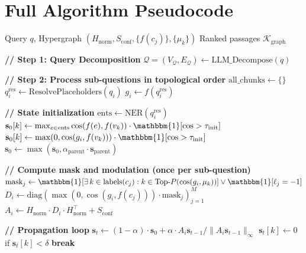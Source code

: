 \documentclass[11pt,a4paper]{article}
\begin{document}
\appendix

\section{Full Algorithm Pseudocode}

\begin{algorithm}[ht]
\caption{HyP-DLM: DAG-Guided Propagation Retrieval}
\label{alg:hypdlm}
\begin{algorithmic}[1]
\Require Query $q$, Hypergraph $(H_{\text{norm}}, S_{\text{conf}}, \{f(c_j)\}, \{\mu_k\})$
\Ensure Ranked passages $\mathcal{K}_{\text{graph}}$

\State \textbf{// Step 1: Query Decomposition}
\State $\mathcal{Q} = (V_\mathcal{Q}, E_\mathcal{Q}) \gets \text{LLM\_Decompose}(q)$ 

\State \textbf{// Step 2: Process sub-questions in topological order}
\State $\text{all\_chunks} \gets \{\}$
    \State $q_i^{\text{res}} \gets \text{ResolvePlaceholders}(q_i)$ 
    \State $g_i \gets f(q_i^{\text{res}})$ 
    
    \State \textbf{// State initialization}
    \State $\text{ents} \gets \text{NER}(q_i^{\text{res}})$
        \State $\mathbf{s}_0[k] \gets \max_{e \in \text{ents}} \cos(f(e), f(v_k)) \cdot \mathbbm{1}[\cos > \tau_{\text{init}}]$
    \Else
        \State $\mathbf{s}_0[k] \gets \max(0, \cos(g_i, f(v_k))) \cdot \mathbbm{1}[\cos > \tau_{\text{init}}]$ 
    \EndIf
        \State $\mathbf{s}_0 \gets \max(\mathbf{s}_0, \alpha_{\text{parent}} \cdot \mathbf{s}_{\text{parent}})$ 
    \EndIf
    
    \State \textbf{// Compute mask and modulation (once per sub-question)}
    \State $\text{mask}_j \gets \mathbbm{1}[\exists\, k \in \text{labels}(c_j) : k \in \text{Top-}P(\cos(g_i, \mu_k))] \lor \mathbbm{1}[\ell_j = -1]$
    \State $D_i \gets \text{diag}(\max(0, \cos(g_i, f(c_j))) \cdot \text{mask}_j)_{j=1}^{M}$
    \State $A_i \gets H_{\text{norm}} \cdot D_i \cdot H_{\text{norm}}^\top + S_{\text{conf}}$
    
    \State \textbf{// Propagation loop}
        \State $\mathbf{s}_t \gets (1 - \alpha) \cdot \mathbf{s}_0 + \alpha \cdot A_i \mathbf{s}_{t-1} / \|A_i \mathbf{s}_{t-1}\|_\infty$
        \State $\mathbf{s}_t[k] \gets 0$ if $\mathbf{s}_t[k] < \delta$ 
            \State \textbf{break} 
        \EndIf
    \EndFor
    

\end{algorithmic}
\end{algorithm}
\end{document}
